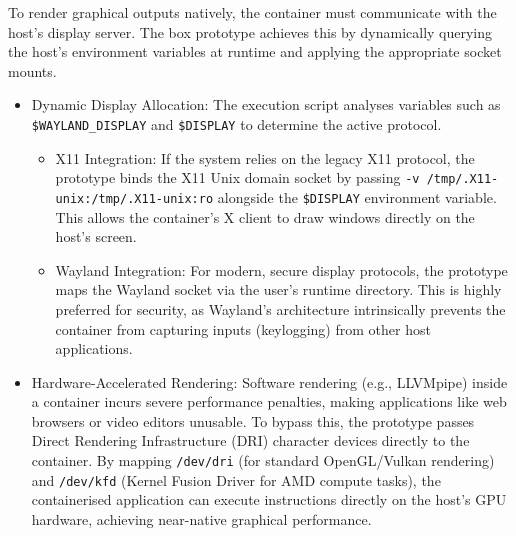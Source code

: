 \documentclass[journal,onecolumn]{IEEEtran}
\newcommand{\code}[1]{\texttt{#1}}
\begin{document}
To render graphical outputs natively, the container must communicate with the host's display server. The box prototype achieves this by dynamically querying the host's environment variables at runtime and applying the appropriate socket mounts.
\begin{itemize}
    \item Dynamic Display Allocation: The execution script analyses variables such as \code{\$WAYLAND\_DISPLAY} and \code{\$DISPLAY} to determine the active protocol.
    \begin{itemize}
        \item X11 Integration: If the system relies on the legacy X11 protocol, the prototype binds the X11 Unix domain socket by passing \code{-v /tmp/.X11-unix:/tmp/.X11-unix:ro} alongside the \code{\$DISPLAY} environment variable. This allows the container's X client to draw windows directly on the host's screen.
        
        \item Wayland Integration: For modern, secure display protocols, the prototype maps the Wayland socket via the user's runtime directory. This is highly preferred for security, as Wayland's architecture intrinsically prevents the container from capturing inputs (keylogging) from other host applications.
    \end{itemize}
    \item Hardware-Accelerated Rendering: Software rendering (e.g., LLVMpipe) inside a container incurs severe performance penalties, making applications like web browsers or video editors unusable. To bypass this, the prototype passes Direct Rendering Infrastructure (DRI) character devices directly to the container. By mapping \code{/dev/dri} (for standard OpenGL/Vulkan rendering) and \code{/dev/kfd} (Kernel Fusion Driver for AMD compute tasks), the containerised application can execute instructions directly on the host's GPU hardware, achieving near-native graphical performance.
\end{itemize}
\end{document}
